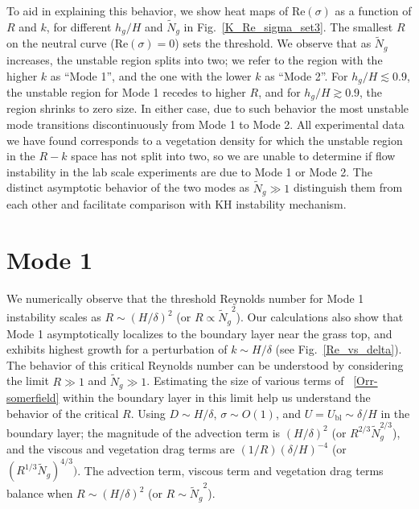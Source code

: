 \documentclass[12pt]{report}   %
\newcommand{\hg}{h_g}
\newcommand{\Rey}{{R}}
\newcommand{\Ndg}{\tilde{N}_g}
\newcommand{\ubl}{U_\text{bl}}
\begin{document}
To aid in explaining this behavior, we show heat maps of Re$(\sigma)$ as a function of $\Rey$ and $k$, for different $\hg/H$ and $\Ndg$ in Fig.~\ref{K_Re_sigma_set3}. 
The smallest $\Rey$ on the neutral curve (Re$(\sigma)=0$) sets the threshold. 
We observe that as $\Ndg$ increases, the unstable region splits into two; we refer to the region with the higher $k$ as ``Mode 1'', and the one with the lower $k$ as ``Mode 2''. 
For $\hg/H\lesssim 0.9$, the unstable region for Mode 1 recedes to higher $\Rey$, and for $\hg/H \gtrsim 0.9$, the region shrinks to zero size.
In either case, due to such behavior the most unstable mode transitions discontinuously from Mode 1 to Mode 2.
All experimental data we have found corresponds to a vegetation density for which the unstable region in the $\Rey-k$ space has not split into two, so we are unable to determine if flow instability in the lab scale experiments \citep{Nepf04} are due to Mode 1 or Mode 2.
The distinct asymptotic behavior of the two modes as $\Ndg \gg 1$ distinguish them from each other and facilitate comparison with KH instability mechanism.

\section{Mode 1}
We numerically observe that the threshold Reynolds number for Mode 1 instability scales as  $\Rey \sim (H/\delta)^2$ (or $\Rey \propto {\Ndg}^{2}$). 
Our calculations also show that Mode 1 asymptotically localizes to the boundary layer near the grass top, and exhibits highest growth for a perturbation of  $k \sim H/\delta$ (see Fig.~\ref{Re_vs_delta}). 
The behavior of this critical Reynolds number can be understood by considering the limit $\Rey \gg 1$ and $\Ndg \gg 1$.
Estimating the size of various terms of ~\eqref{Orr-somerfield} within the boundary layer in this limit help us understand the behavior of the critical $\Rey$. 
Using $D\sim H/\delta$, $\sigma \sim O(1)$, and $U=\ubl \sim \delta/H$ in the boundary layer; the magnitude of the advection term is $ (H/\delta)^2$  (or $\Rey^{2/3} \Ndg^{2/3}$), and the viscous and vegetation drag terms are $(1/\Rey) (\delta/H)^{-4}$ (or $(\Rey^{1/3} \Ndg)^{4/3})$. 
The advection term, viscous term and vegetation drag terms balance when $\Rey \sim (H/\delta)^2$ (or $\Rey \sim {\Ndg}^{2}$).
\end{document}
